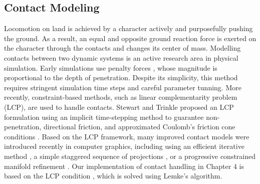 \subsection{Contact Modeling}
Locomotion on land is achieved by a character actively and purposefully pushing the ground. As a result, an equal and opposite ground reaction force is exerted on the character through the contacts and changes its center of mass. Modelling contacts between two dynamic systems is an active research area in physical simulation. Early simulations use penalty forces \cite{Terzopoulos:1987}, whose magnitude is proportional to the depth of penetration. Despite its simplicity, this method requires stringent simulation time steps and careful parameter tunning. More recently, constraint-based methods, such as linear complementarity problem (LCP), are used to handle contacts. Stewart and Trinkle proposed an
LCP formulation using an implicit time-stepping method to guarantee
non-penetration, directional friction, and approximated Coulomb's
friction cone conditions \cite{Stewart:1996}. Based on the LCP
framework, many improved contact models were introduced recently in
computer graphics, including using an efficient iterative method
\cite{Erleben:2007}, a simple staggered sequence of projections
\cite{Kaufman:2008}, or a progressive constrained manifold
refinement \cite{Otaduy:2009}. Our implementation of contact handling in Chapter 4 is based on the LCP condition \cite{Tan:2012}, which is solved using Lemke's algorithm.


